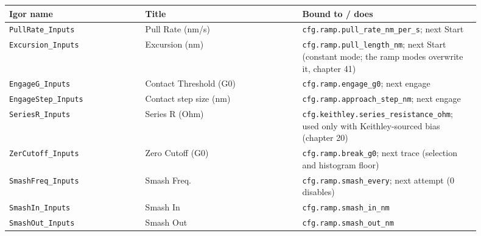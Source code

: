 \small\setlength{\LTleft}{0pt}\setlength{\LTright}{\fill}
\begin{longtable}{@{}>{\raggedright\arraybackslash}p{0.26\linewidth}>{\raggedright\arraybackslash}p{0.30\linewidth}>{\raggedright\arraybackslash}p{0.34\linewidth}@{}}
\toprule
\textbf{Igor name} & \textbf{Title} & \textbf{Bound to / does} \\
\midrule\endhead
\texttt{Pull\discretionary{}{}{}Rate\_\discretionary{}{}{}Inputs} & Pull Rate (nm/s) & \texttt{cfg.\discretionary{}{}{}ramp.\discretionary{}{}{}pull\_\discretionary{}{}{}rate\_\discretionary{}{}{}nm\_\discretionary{}{}{}per\_\discretionary{}{}{}s}; next Start \\
\texttt{Excursion\_\discretionary{}{}{}Inputs} & Excursion (nm) & \texttt{cfg.\discretionary{}{}{}ramp.\discretionary{}{}{}pull\_\discretionary{}{}{}length\_\discretionary{}{}{}nm}; next Start (constant mode; the ramp modes overwrite it, chapter 41) \\
\texttt{Engage\discretionary{}{}{}G\_\discretionary{}{}{}Inputs} & Contact Threshold (G0) & \texttt{cfg.\discretionary{}{}{}ramp.\discretionary{}{}{}engage\_\discretionary{}{}{}g0}; next engage \\
\texttt{Engage\discretionary{}{}{}Step\_\discretionary{}{}{}Inputs} & Contact step size (nm) & \texttt{cfg.\discretionary{}{}{}ramp.\discretionary{}{}{}approach\_\discretionary{}{}{}step\_\discretionary{}{}{}nm}; next engage \\
\texttt{Series\discretionary{}{}{}R\_\discretionary{}{}{}Inputs} & Series R (Ohm) & \texttt{cfg.\discretionary{}{}{}keithley.\discretionary{}{}{}series\_\discretionary{}{}{}resistance\_\discretionary{}{}{}ohm}; used only with Keithley-sourced bias (chapter 20) \\
\texttt{Zer\discretionary{}{}{}Cutoff\_\discretionary{}{}{}Inputs} & Zero Cutoff (G0) & \texttt{cfg.\discretionary{}{}{}ramp.\discretionary{}{}{}break\_\discretionary{}{}{}g0}; next trace (selection and histogram floor) \\
\texttt{Smash\discretionary{}{}{}Freq\_\discretionary{}{}{}Inputs} & Smash Freq. & \texttt{cfg.\discretionary{}{}{}ramp.\discretionary{}{}{}smash\_\discretionary{}{}{}every}; next attempt (0 disables) \\
\texttt{Smash\discretionary{}{}{}In\_\discretionary{}{}{}Inputs} & Smash In & \texttt{cfg.\discretionary{}{}{}ramp.\discretionary{}{}{}smash\_\discretionary{}{}{}in\_\discretionary{}{}{}nm} \\
\texttt{Smash\discretionary{}{}{}Out\_\discretionary{}{}{}Inputs} & Smash Out & \texttt{cfg.\discretionary{}{}{}ramp.\discretionary{}{}{}smash\_\discretionary{}{}{}out\_\discretionary{}{}{}nm} \\

\end{longtable}
